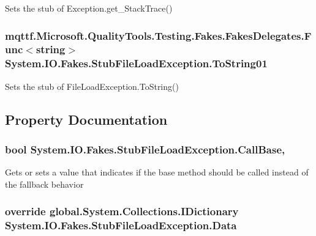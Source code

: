 Sets the stub of Exception.\-get\-\_\-\-Stack\-Trace()

\hypertarget{class_system_1_1_i_o_1_1_fakes_1_1_stub_file_load_exception_a8c20de968a71c3619e49db6dac4d69d1}{
\subsubsection[{To\-String01}]{\setlength{\rightskip}{0pt plus 5cm}mqttf.\-Microsoft.\-Quality\-Tools.\-Testing.\-Fakes.\-Fakes\-Delegates.\-Func$<$string$>$ System.\-I\-O.\-Fakes.\-Stub\-File\-Load\-Exception.\-To\-String01}}\label{class_system_1_1_i_o_1_1_fakes_1_1_stub_file_load_exception_a8c20de968a71c3619e49db6dac4d69d1}


Sets the stub of File\-Load\-Exception.\-To\-String()



\subsection{Property Documentation}
\hypertarget{class_system_1_1_i_o_1_1_fakes_1_1_stub_file_load_exception_aa8477702aac988c68b962c652520e792}{
\subsubsection[{Call\-Base}]{\setlength{\rightskip}{0pt plus 5cm}bool System.\-I\-O.\-Fakes.\-Stub\-File\-Load\-Exception.\-Call\-Base\hspace{0.3cm}{\ttfamily [get]}, {\ttfamily [set]}}}\label{class_system_1_1_i_o_1_1_fakes_1_1_stub_file_load_exception_aa8477702aac988c68b962c652520e792}


Gets or sets a value that indicates if the base method should be called instead of the fallback behavior

\hypertarget{class_system_1_1_i_o_1_1_fakes_1_1_stub_file_load_exception_a274f109dab429d2786bcbd011e7c58d0}{
\subsubsection[{Data}]{\setlength{\rightskip}{0pt plus 5cm}override global.\-System.\-Collections.\-I\-Dictionary System.\-I\-O.\-Fakes.\-Stub\-File\-Load\-Exception.\-Data\hspace{0.3cm}{\ttfamily [get]}}}\label{class_system_1_1_i_o_1_1_fakes_1_1_stub_file_load_exception_a274f109dab429d2786bcbd011e7c58d0}


